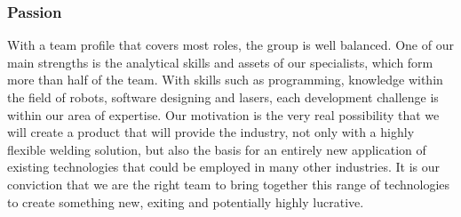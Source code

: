\subsubsection{Passion}
With a team profile that covers most roles, the group is well balanced. One of our main strengths is the analytical skills and assets of our specialists, which form more than half of the team.  
With skills such as programming, knowledge within the field of robots, software designing and lasers, each development challenge is within our area of expertise. 
Our motivation is the very real possibility that we will create a product that will provide the industry, not only with a highly flexible welding solution, but also the basis for an entirely new application of existing technologies that could be employed in many other industries.
It is our conviction that we are the right team to bring together this range of technologies to create something new, exiting and potentially highly lucrative.